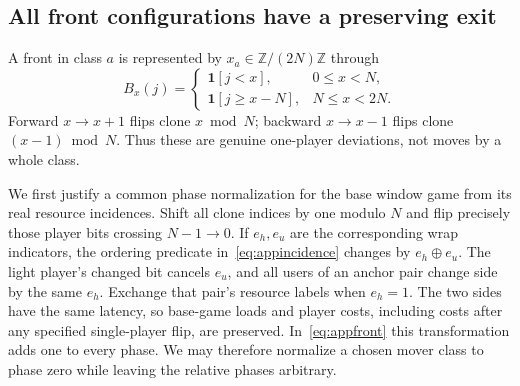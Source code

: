 \documentclass[11pt]{article}
\theoremstyle{definition}
\newcommand{\ind}{\mathbf 1}
\newcommand{\xor}{\mathbin{\oplus}}
\begin{document}
\subsection{All front configurations have a preserving exit}\label{app:frontcoverage}
A front in class $a$ is represented by $x_a\in\mathbb Z/(2N)\mathbb Z$ through
\begin{equation}\label{eq:appfront}
 B_x(j)=\begin{cases}
 \ind[j<x],&0\le x<N,\\
 \ind[j\ge x-N],&N\le x<2N.
 \end{cases}
\end{equation}
Forward $x\to x+1$ flips clone $x\bmod N$; backward $x\to x-1$ flips clone $(x-1)\bmod N$. Thus these are genuine one-player deviations, not moves by a whole class.

We first justify a common phase normalization for the base window game from its real resource incidences. Shift all clone indices by one modulo $N$ and flip precisely those player bits crossing $N-1\to0$. If $e_h,e_u$ are the corresponding wrap indicators, the ordering predicate in~\eqref{eq:appincidence} changes by $e_h\xor e_u$. The light player's changed bit cancels $e_u$, and all users of an anchor pair change side by the same $e_h$. Exchange that pair's resource labels when $e_h=1$. The two sides have the same latency, so base-game loads and player costs, including costs after any specified single-player flip, are preserved. In~\eqref{eq:appfront} this transformation adds one to every phase. We may therefore normalize a chosen mover class to phase zero while leaving the relative phases arbitrary.
\end{document}
